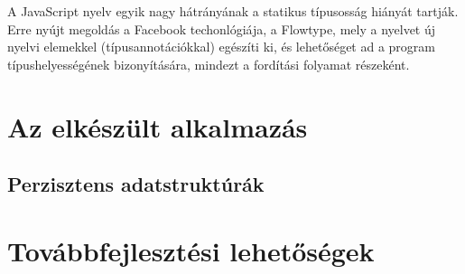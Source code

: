 \documentclass[11pt]{article}
\begin{document}
A JavaScript nyelv egyik nagy hátrányának a statikus típusosság hiányát tartják.
Erre nyújt megoldás a Facebook techonlógiája, a Flowtype, mely a nyelvet
új nyelvi elemekkel (típusannotációkkal) egészíti ki, és lehetőséget ad a program
típushelyességének bizonyítására, mindezt a fordítási folyamat részeként.


\section{Az elkészült alkalmazás}


\subsection{Perzisztens adatstruktúrák}


\section{Továbbfejlesztési lehetőségek}

\end{document}
